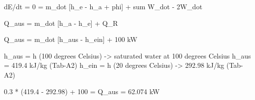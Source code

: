 dE/dt = 0 = m_dot [h_e - h_a + phi] + sum W_dot - 2W_dot

Q_aus = m_dot [h_a - h_e] + Q_R

Q_aus = m_dot [h_aus - h_ein] + 100 kW

h_aus = h (100 degrees Celsius) -> saturated water at 100 degrees Celsius
h_aus = 419.4 kJ/kg (Tab-A2)
h_ein = h (20 degrees Celsius) -> 292.98 kJ/kg (Tab-A2)

0.3 * (419.4 - 292.98) + 100 = Q_aus = 62.074 kW